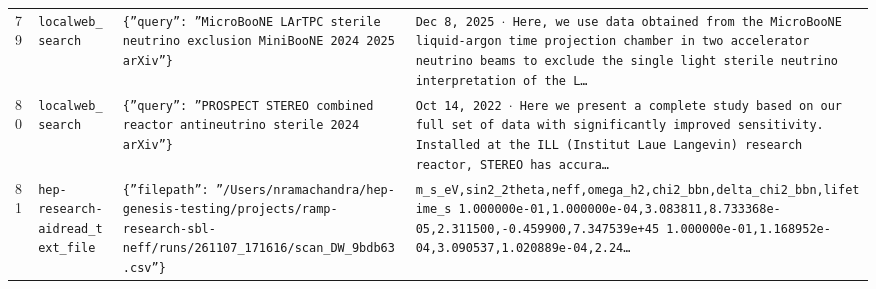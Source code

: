 \documentclass[11pt,a4paper]{article}
\begin{document}
\begin{longtable}{@{}p{}p{}p{}p{}@{}}
79 & \texttt{local}\newline\texttt{web\_\allowbreak{}search} & \texttt{\{''query'':\allowbreak{} ''MicroBooNE LArTPC sterile neutrino exclusion MiniBooNE 2024 2025 arXiv''\}\allowbreak{}} & \texttt{Dec 8,\allowbreak{} 2025 $\cdot$ Here,\allowbreak{} we use data obtained from the MicroBooNE liquid-argon time projection chamber in two accelerator neutrino beams to exclude the single light sterile neutrino interpretation of the L\ldots{}\allowbreak{}} \\
80 & \texttt{local}\newline\texttt{web\_\allowbreak{}search} & \texttt{\{''query'':\allowbreak{} ''PROSPECT STEREO combined reactor antineutrino sterile 2024 arXiv''\}\allowbreak{}} & \texttt{Oct 14,\allowbreak{} 2022 $\cdot$ Here we present a complete study based on our full set of data with significantly improved sensitivity. Installed at the ILL (Institut Laue Langevin)\allowbreak{} research reactor,\allowbreak{} STEREO has accura\ldots{}\allowbreak{}} \\
81 & \texttt{hep-research-aid}\newline\texttt{read\_\allowbreak{}text\_\allowbreak{}file} & \texttt{\{''filepath'':\allowbreak{} ''/\allowbreak{}Users/\allowbreak{}nramachandra/\allowbreak{}hep-genesis-testing/\allowbreak{}projects/\allowbreak{}ramp-research-sbl-neff/\allowbreak{}runs/\allowbreak{}261107\_\allowbreak{}171616/\allowbreak{}scan\_\allowbreak{}DW\_\allowbreak{}9bdb63.csv''\}\allowbreak{}} & \texttt{m\_\allowbreak{}s\_\allowbreak{}eV,\allowbreak{}sin2\_\allowbreak{}2theta,\allowbreak{}neff,\allowbreak{}omega\_\allowbreak{}h2,\allowbreak{}chi2\_\allowbreak{}bbn,\allowbreak{}delta\_\allowbreak{}chi2\_\allowbreak{}bbn,\allowbreak{}lifetime\_\allowbreak{}s 1.000000e-01,\allowbreak{}1.000000e-04,\allowbreak{}3.083811,\allowbreak{}8.733368e-05,\allowbreak{}2.311500,\allowbreak{}-0.459900,\allowbreak{}7.347539e+45 1.000000e-01,\allowbreak{}1.168952e-04,\allowbreak{}3.090537,\allowbreak{}1.020889e-04,\allowbreak{}2.24\ldots{}\allowbreak{}} \\

\end{longtable}
\end{document}
